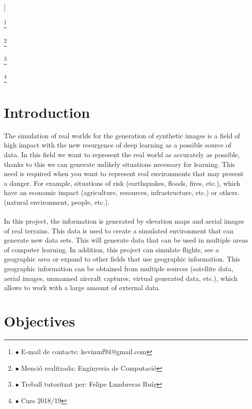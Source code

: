 \documentclass[10pt,a4paper,twocolumn,twoside]{article}
\newcommand\blfootnote[1]{%
  \begingroup
  \renewcommand\thefootnote{}\footnote{#1}%
  \addtocounter{footnote}{-1}%
  \endgroup
}
\begin{document}
\begin{@twocolumnfalse}
\begin{center}
\bigskip

{\vrule depth 0pt height 0.5pt width 4cm\hspace{7.5pt}%
%
\hspace{7.5pt}\vrule depth 0pt height 0.5pt width 4cm\relax}

\end{center}

\bigskip
\end{@twocolumnfalse}]

\blfootnote{$\bullet$ E-mail de contacte: kevinmf94@gmail.com}
\blfootnote{$\bullet$ Menció realitzada: Enginyeria de Computació}
\blfootnote{$\bullet$ Treball tutoritzat per: Felipe Lumbreras Ruíz}
\blfootnote{$\bullet$ Curs 2018/19}

\vspace{-1cm}
\section{Introduction}
The simulation of real worlds for the generation of synthetic images is a field of high impact with the new resurgence of deep learning as a possible source of data. In this field we want to represent the real world as accurately as possible, thanks to this we can generate unlikely situations necessary for learning. This need is required when you want to represent real environments that may present a danger. For example, situations of risk (earthquakes, floods, fires, etc.), which have an economic impact (agriculture, resources, infrastructure, etc.) or others. (natural environment, people, etc.).
\\
\\
In this project, the information is generated by elevation maps and aerial images of real terrains. This data is used to create a simulated environment that can generate new data sets. This will generate data that can be used in multiple areas of computer learning. In addition, this project can simulate flights, see a geographic area or expand to other fields that use geographic information. This geographic information can be obtained from multiple sources (satellite data, aerial images, unmanned aircraft captures, virtual generated data, etc.), which allows to work with a large amount of external data.

\section{Objectives}
\end{document}
